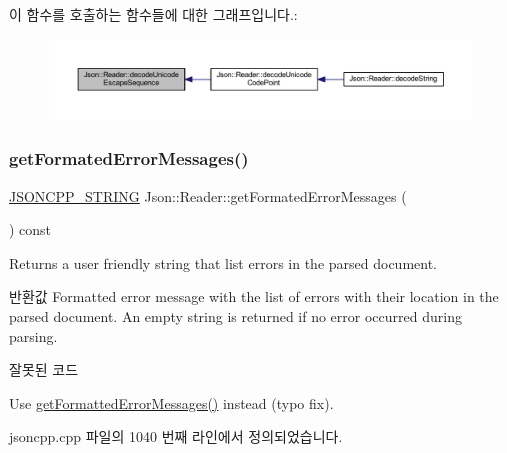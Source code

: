 이 함수를 호출하는 함수들에 대한 그래프입니다.\+:\nopagebreak
\begin{figure}[H]
\begin{center}
\leavevmode
\includegraphics[width=350pt]{class_json_1_1_reader_a469cb6f55971d7c41fca2752a3aa5bf7_icgraph}
\end{center}
\end{figure}
\mbox{\label{class_json_1_1_reader_a791cbc5afd1bef1631e07239dc452c79}} 
\subsubsection{\texorpdfstring{get\+Formated\+Error\+Messages()}{getFormatedErrorMessages()}}
{\footnotesize\ttfamily \hyperlink{json_8h_a1e723f95759de062585bc4a8fd3fa4be}{J\+S\+O\+N\+C\+P\+P\+\_\+\+S\+T\+R\+I\+NG} Json\+::\+Reader\+::get\+Formated\+Error\+Messages (\begin{DoxyParamCaption}{ }\end{DoxyParamCaption}) const}



Returns a user friendly string that list errors in the parsed document. 

\begin{DoxyReturn}{반환값}
Formatted error message with the list of errors with their location in the parsed document. An empty string is returned if no error occurred during parsing. 
\end{DoxyReturn}
\begin{DoxyRefDesc}{잘못된 코드}
\item[\hyperlink{deprecated__deprecated000006}{잘못된 코드}]Use \hyperlink{class_json_1_1_reader_ae638a7b1f36f7ccf99ba89fa36ccf222}{get\+Formatted\+Error\+Messages()} instead (typo fix). \end{DoxyRefDesc}


jsoncpp.\+cpp 파일의 1040 번째 라인에서 정의되었습니다.



